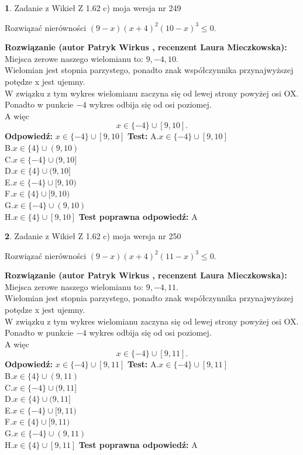\documentclass[12pt, a4paper]{article}
\theoremstyle{definition} %
\newtheorem{zad}{}
\newcommand{\zadStart}[1]{\begin{zad}#1\newline}
\newcommand{\zadStop}{\end{zad}}
\newcommand{\rozwStart}[2]{\noindent \textbf{Rozwiązanie (autor #1 , recenzent #2): }\newline}
\newcommand{\rozwStop}{\newline}
\newcommand{\odpStart}{\noindent \textbf{Odpowiedź:}\newline}
\newcommand{\odpStop}{\newline}
\newcommand{\testStart}{\noindent \textbf{Test:}\newline}
\newcommand{\testStop}{\newline}
\newcommand{\kluczStart}{\noindent \textbf{Test poprawna odpowiedź:}\newline}
\newcommand{\kluczStop}{\newline}
\begin{document}
\zadStart{Zadanie z Wikieł Z 1.62 c) moja wersja nr 249}

Rozwiązać nierówności $(9-x)(x+4)^{2}(10-x)^{3}\le0$.
\zadStop
\rozwStart{Patryk Wirkus}{Laura Mieczkowska}
Miejsca zerowe naszego wielomianu to: $9, -4, 10$.\\
Wielomian jest stopnia parzystego, ponadto znak współczynnika przy\linebreak najwyższej potędze x jest ujemny.\\ W związku z tym wykres wielomianu zaczyna się od lewej strony powyżej osi OX.\\
Ponadto w punkcie $-4$ wykres odbija się od osi poziomej.\\
A więc $$x \in \{-4\} \cup [9,10].$$
\rozwStop
\odpStart
$x \in \{-4\} \cup [9,10]$
\odpStop
\testStart
A.$x \in \{-4\} \cup [9,10]$\\
B.$x \in \{4\} \cup (9,10)$\\
C.$x \in \{-4\} \cup (9,10]$\\
D.$x \in \{4\} \cup (9,10]$\\
E.$x \in \{-4\} \cup [9,10)$\\
F.$x \in \{4\} \cup [9,10)$\\
G.$x \in \{-4\} \cup (9,10)$\\
H.$x \in \{4\} \cup [9,10]$
\testStop
\kluczStart
A
\kluczStop



\zadStart{Zadanie z Wikieł Z 1.62 c) moja wersja nr 250}

Rozwiązać nierówności $(9-x)(x+4)^{2}(11-x)^{3}\le0$.
\zadStop
\rozwStart{Patryk Wirkus}{Laura Mieczkowska}
Miejsca zerowe naszego wielomianu to: $9, -4, 11$.\\
Wielomian jest stopnia parzystego, ponadto znak współczynnika przy\linebreak najwyższej potędze x jest ujemny.\\ W związku z tym wykres wielomianu zaczyna się od lewej strony powyżej osi OX.\\
Ponadto w punkcie $-4$ wykres odbija się od osi poziomej.\\
A więc $$x \in \{-4\} \cup [9,11].$$
\rozwStop
\odpStart
$x \in \{-4\} \cup [9,11]$
\odpStop
\testStart
A.$x \in \{-4\} \cup [9,11]$\\
B.$x \in \{4\} \cup (9,11)$\\
C.$x \in \{-4\} \cup (9,11]$\\
D.$x \in \{4\} \cup (9,11]$\\
E.$x \in \{-4\} \cup [9,11)$\\
F.$x \in \{4\} \cup [9,11)$\\
G.$x \in \{-4\} \cup (9,11)$\\
H.$x \in \{4\} \cup [9,11]$
\testStop
\kluczStart
A
\kluczStop
\end{document}
